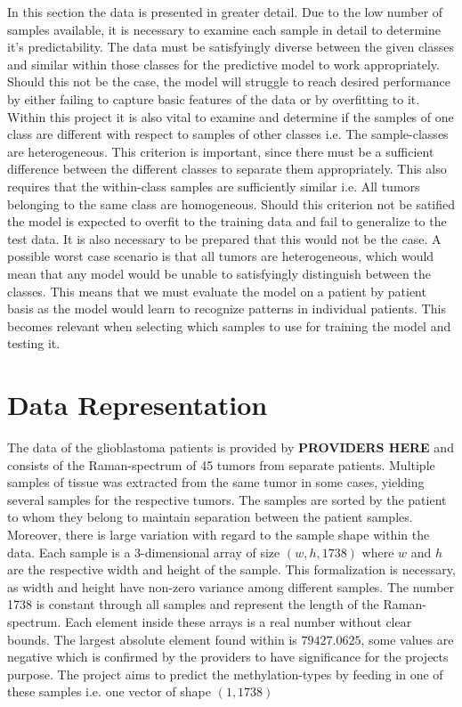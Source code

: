 In this section the data is presented in greater detail. Due to the low number of samples available, it is necessary to examine each sample in detail to determine it's predictability. The data must be satisfyingly diverse between the given classes and similar within those classes for the predictive model to work appropriately. Should this not be the case, the model will struggle to reach desired performance by either failing to capture basic features of the data or by overfitting to it. Within this project it is also vital to examine and determine if the samples of one class are different with respect to samples of other classes i.e. The sample-classes are heterogeneous. This criterion is important, since there must be a sufficient difference between the different classes to separate them appropriately. This also requires that the within-class samples are sufficiently similar i.e. All tumors belonging to the same class are homogeneous. Should this criterion not be satified the model is expected to overfit to the training data and fail to generalize to the test data. It is also necessary to be prepared that this would not be the case. A possible worst case scenario is that all tumors are heterogeneous, which would mean that any model would be unable to satisfyingly distinguish between the classes. This means that we must evaluate the model on a patient by patient basis as the model would learn to recognize patterns in individual patients. This becomes relevant when selecting which samples to use for training the model and testing it.  

\section{Data Representation}
The data of the glioblastoma patients is provided by \textbf{PROVIDERS HERE} and consists of the Raman-spectrum of 45 tumors from separate patients. Multiple samples of tissue was extracted from the same tumor in some cases, yielding several samples for the respective tumors. The samples are sorted by the patient to whom they belong to maintain separation between the patient samples. Moreover, there is large variation with regard to the sample shape within the data. Each sample is a 3-dimensional array of size $(w, h, 1738)$ where $w$ and $h$ are the respective width and height of the sample. This formalization is necessary, as width and height have non-zero variance among different samples. The number 1738 is constant through all samples and represent the length of the Raman-spectrum. Each element inside these arrays is a real number without clear bounds. The largest absolute element found within is $79427.0625$, some values are negative which is confirmed by the providers to have significance for the projects purpose. The project aims to predict the methylation-types by feeding in one of these samples i.e. one vector of shape $(1, 1738)$

